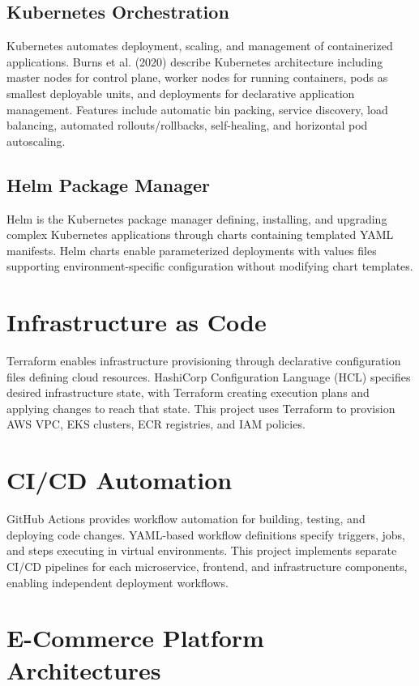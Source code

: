 \subsection{Kubernetes Orchestration}

Kubernetes automates deployment, scaling, and management of containerized applications. Burns et al. (2020) describe Kubernetes architecture including master nodes for control plane, worker nodes for running containers, pods as smallest deployable units, and deployments for declarative application management. Features include automatic bin packing, service discovery, load balancing, automated rollouts/rollbacks, self-healing, and horizontal pod autoscaling.

\subsection{Helm Package Manager}

Helm is the Kubernetes package manager defining, installing, and upgrading complex Kubernetes applications through charts containing templated YAML manifests. Helm charts enable parameterized deployments with values files supporting environment-specific configuration without modifying chart templates.

\section{Infrastructure as Code}

Terraform enables infrastructure provisioning through declarative configuration files defining cloud resources. HashiCorp Configuration Language (HCL) specifies desired infrastructure state, with Terraform creating execution plans and applying changes to reach that state. This project uses Terraform to provision AWS VPC, EKS clusters, ECR registries, and IAM policies.

\section{CI/CD Automation}

GitHub Actions provides workflow automation for building, testing, and deploying code changes. YAML-based workflow definitions specify triggers, jobs, and steps executing in virtual environments. This project implements separate CI/CD pipelines for each microservice, frontend, and infrastructure components, enabling independent deployment workflows.

\section{E-Commerce Platform Architectures}

